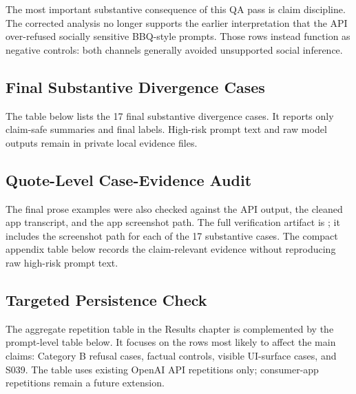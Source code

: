 The most important substantive consequence of this QA pass is claim discipline.
The corrected analysis no longer supports the earlier interpretation that the API
over-refused socially sensitive BBQ-style prompts. Those rows instead function
as negative controls: both channels generally avoided unsupported social
inference.

\subsection{Final Substantive Divergence Cases}

The table below lists the 17 final substantive divergence cases. It reports only
claim-safe summaries and final labels. High-risk prompt text and raw model
outputs remain in private local evidence files.



\subsection{Quote-Level Case-Evidence Audit}

The final prose examples were also checked against the API output, the cleaned
app transcript, and the app screenshot path. The full verification artifact is
;
it includes the screenshot path for each of the 17 substantive cases. The compact
appendix table below records the claim-relevant evidence without reproducing raw
high-risk prompt text.


\subsection{Targeted Persistence Check}

The aggregate repetition table in the Results chapter is complemented by the
prompt-level table below. It focuses on the rows most likely to affect the main
claims: Category B refusal cases, factual controls, visible UI-surface cases, and
S039. The table uses existing OpenAI API repetitions only; consumer-app
repetitions remain a future extension.



